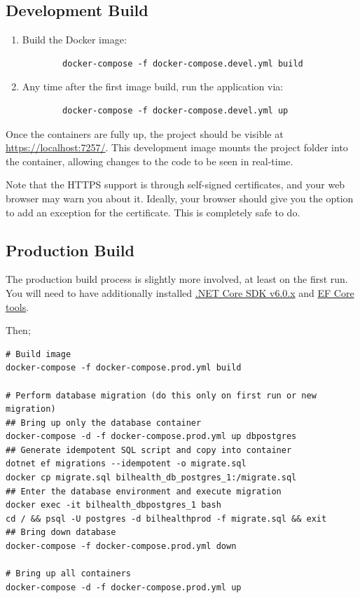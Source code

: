 \documentclass[a4paper, 12pt, titlepage]{article}
\begin{document}
  \subsection{Development Build}
  
  \begin{enumerate}
    \item Build the Docker image:
      \begin{verbatim}
        docker-compose -f docker-compose.devel.yml build
      \end{verbatim}
    \item Any time after the first image build, run the application via:
      \begin{verbatim}
        docker-compose -f docker-compose.devel.yml up
      \end{verbatim}
  \end{enumerate}
  
  Once the containers are fully up, the project should be visible at \url{https://localhost:7257/}. 
  This development image mounts the project folder into the container, allowing changes to the code to be seen in real-time.
  
  Note that the HTTPS support is through self-signed certificates, and your web browser may warn you about it.
  Ideally, your browser should give you the option to add an exception for the certificate.
  This is completely safe to do.
  
  \pagebreak
  \subsection{Production Build}
  
  The production build process is slightly more involved, at least on the first run.
  You will need to have additionally installed
  \href{https://dotnet.microsoft.com/en-us/download/dotnet/6.0}{.NET Core SDK v6.0.x} and
  \href{https://docs.microsoft.com/en-us/ef/core/cli/dotnet\#installing-the-tools}{EF Core tools}.
  
  Then;
  
  \begin{verbatim}
# Build image
docker-compose -f docker-compose.prod.yml build

# Perform database migration (do this only on first run or new migration)
## Bring up only the database container
docker-compose -d -f docker-compose.prod.yml up dbpostgres
## Generate idempotent SQL script and copy into container
dotnet ef migrations --idempotent -o migrate.sql
docker cp migrate.sql bilhealth_db_postgres_1:/migrate.sql
## Enter the database environment and execute migration
docker exec -it bilhealth_dbpostgres_1 bash
cd / && psql -U postgres -d bilhealthprod -f migrate.sql && exit
## Bring down database
docker-compose -f docker-compose.prod.yml down

# Bring up all containers
docker-compose -d -f docker-compose.prod.yml up
  \end{verbatim}
  
\end{document}
